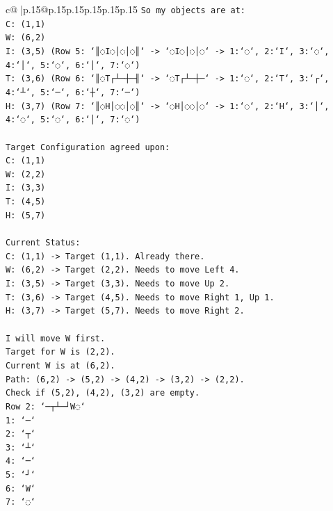 \documentclass{article}
\begin{document}
{\begin{supertabular}{c@{$\;$}|p{.15\linewidth}@{}p{.15\linewidth}p{.15\linewidth}p{.15\linewidth}p{.15\linewidth}p{.15\linewidth}}
{{{\texttt{So my objects are at:} \\
\texttt{C: (1,1)} \\
\texttt{W: (6,2)} \\
\texttt{I: (3,5) (Row 5: `║◌I◌│◌│◌║` {-}> `◌I◌│◌│◌` {-}> 1:`◌`, 2:`I`, 3:`◌`, 4:`│`, 5:`◌`, 6:`│`, 7:`◌`)} \\
\texttt{T: (3,6) (Row 6: `║◌T┌┴─┼─╢` {-}> `◌T┌┴─┼─` {-}> 1:`◌`, 2:`T`, 3:`┌`, 4:`┴`, 5:`─`, 6:`┼`, 7:`─`)} \\
\texttt{H: (3,7) (Row 7: `║◌H│◌◌│◌║` {-}> `◌H│◌◌│◌` {-}> 1:`◌`, 2:`H`, 3:`│`, 4:`◌`, 5:`◌`, 6:`│`, 7:`◌`)} \\
\\ 
\texttt{Target Configuration agreed upon:} \\
\texttt{C: (1,1)} \\
\texttt{W: (2,2)} \\
\texttt{I: (3,3)} \\
\texttt{T: (4,5)} \\
\texttt{H: (5,7)} \\
\\ 
\texttt{Current Status:} \\
\texttt{C: (1,1) {-}> Target (1,1). Already there.} \\
\texttt{W: (6,2) {-}> Target (2,2). Needs to move Left 4.} \\
\texttt{I: (3,5) {-}> Target (3,3). Needs to move Up 2.} \\
\texttt{T: (3,6) {-}> Target (4,5). Needs to move Right 1, Up 1.} \\
\texttt{H: (3,7) {-}> Target (5,7). Needs to move Right 2.} \\
\\ 
\texttt{I will move W first.} \\
\texttt{Target for W is (2,2).} \\
\texttt{Current W is at (6,2).} \\
\texttt{Path: (6,2) {-}> (5,2) {-}> (4,2) {-}> (3,2) {-}> (2,2).} \\
\texttt{Check if (5,2), (4,2), (3,2) are empty.} \\
\texttt{Row 2: `─┬┴─┘W◌`} \\
\texttt{1: `─`} \\
\texttt{2: `┬`} \\
\texttt{3: `┴`} \\
\texttt{4: `─`} \\
\texttt{5: `┘`} \\
\texttt{6: `W`} \\
\texttt{7: `◌`} \\
}}}
\end{supertabular}}
\end{document}

